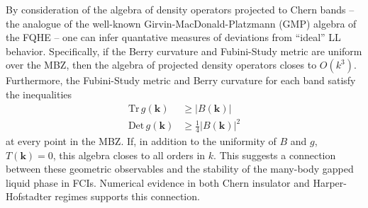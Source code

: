 \documentclass[aps,prb,twocolumn,letterpaper,twoside,nobalancelastpage,groupedaddress,amsmath,amssymb,floatfix,citeautoscript]{revtex4-1}
\begin{document}
By consideration of the algebra of density operators projected to Chern bands -- the analogue of the well-known Girvin-MacDonald-Platzmann (GMP) algebra of the FQHE \cite{Girvin:1986bu} -- one can infer quantative measures of deviations from ``ideal'' LL behavior\cite{parameswaran_fractional_2012,roy_band_2014}. Specifically, if the Berry curvature and Fubini-Study metric are uniform over the MBZ, then the algebra of projected density operators closes to $O(k^3)$. Furthermore, the Fubini-Study metric and Berry curvature for each band satisfy the inequalities\cite{roy_band_2014}
\begin{align}
\label{band-geom-ineq}
\text{Tr}\,g(\mathbf{k})&\geq|B(\mathbf{k})| \\
\text{Det}\,g(\mathbf{k})&\geq\frac{1}{4}|B(\mathbf{k})|^2 
\end{align}
at every point in the MBZ. If, in addition to the uniformity of $B$ and $g$, $T(\mathbf{k})=0$, this algebra closes to all orders in $k$. This suggests a connection between these geometric observables and the stability of the many-body gapped liquid phase in FCIs. Numerical evidence in both Chern insulator\cite{jackson_geometric_2015} and Harper-Hofstadter\cite{bauer_quantum_2016} regimes supports this connection.
\end{document}
